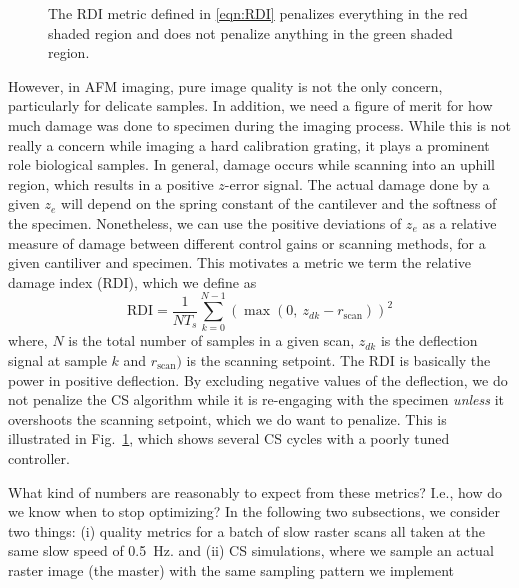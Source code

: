 \documentclass[11pt]{article}
\begin{document}
\begin{figure}
  \centering
  
  \caption{The RDI metric defined in \eqref{eqn:RDI} penalizes everything in the red shaded region and does not penalize anything in the green shaded region.}
  \label{fig:damage_illustrate}
\end{figure}
However, in AFM imaging, pure image quality is not the only concern, particularly for delicate samples. In addition, we need a figure of merit for how much damage was done to specimen during the imaging process. While this is not really a concern while imaging a hard calibration grating, it plays a prominent role biological samples. In general, damage occurs while scanning into an uphill region, which results in a positive $z$-error signal. The actual damage done by a given $z_e$ will depend on the spring constant of the cantilever and the softness of the specimen. Nonetheless, we can use the positive deviations of $z_e$ as a relative measure of damage between different control gains or scanning methods, for a given cantiliver and specimen. This motivates a metric we term the relative damage index (RDI), which we define as 
\begin{equation}
  \text{RDI} = \frac{1}{NT_s}\sum_{k=0}^{N-1} \left(\max(0,~z_{dk}-r_{\textrm{scan}})\right)^2 \label{eqn:RDI}
\end{equation}
where, $N$ is the total number of samples in a given scan, $z_{dk}$ is the deflection signal at sample $k$ and $r_{\textrm{scan}})$ is the scanning setpoint. 
The RDI is basically the power in positive deflection.
By excluding negative values of the deflection, we do not penalize the CS algorithm while it is re-engaging with the specimen \emph{unless} it overshoots the scanning setpoint, which we do want to penalize. This is illustrated in Fig.~\ref{fig:damage_illustrate}, which shows several CS cycles with a poorly tuned controller.

What kind of numbers are reasonably to expect from these metrics? I.e., how do we know when to stop optimizing? In the following two subsections,  we consider two things: (i) quality metrics for a batch of slow raster scans all taken at the same slow speed of 0.5~Hz. and (ii) CS simulations, where we sample an actual raster image (the master) with the same sampling pattern we implement 
\end{document}
